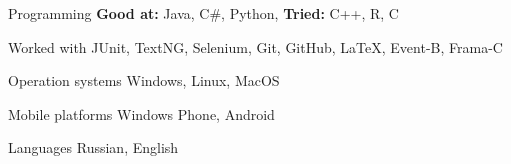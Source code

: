 


\begin{cvskills}


\cvskill
{Programming} %
{\textbf{Good at:} Java, C\#, Python, \textbf{Tried:} C++, R, C} %

\cvskill
{Worked with} %
{JUnit, TextNG, Selenium, Git, GitHub, LaTeX, Event-B, Frama-C} %

\cvskill
{Operation systems} %
{Windows, Linux, MacOS} %

\cvskill
{Mobile platforms} %
{Windows Phone, Android} %


\cvskill
{Languages} %
{Russian, English} %


\end{cvskills}